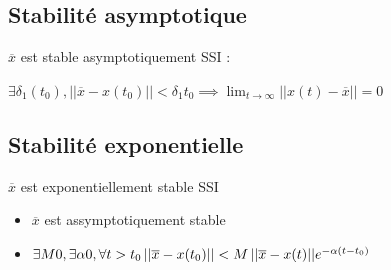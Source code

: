\subsection{Stabilité asymptotique}
$\overline{x}$ est stable asymptotiquement SSI :
\begin{center}
    \Large{$
    \exists \delta_{1}(t_{0}), \left\lvert\lvert \overline{x} - x(t_{0}) \right\rvert\rvert < \delta_{1}t_{0} \implies
    \lim_{t \to \infty}{\left\lvert\lvert x(t) - \overline{x} \right\rvert\rvert} = 0
    $}
\end{center}
\subsection{Stabilité exponentielle}
$\overline{x}$ est exponentiellement stable SSI
\begin{itemize}
    \item $\overline{x}$ est assymptotiquement stable
    \item \Large{$
            \exists M 0 ,\exists \alpha 0, \forall t > t_{0} \newline
            \left\lvert\lvert \overline{x} - x(t_{0}) \right\rvert\rvert < 
            M \left\lvert\lvert \overline{x} - x(t) \right\rvert\rvert e^{-\alpha(t-t_{0})} 
            $}
\end{itemize}
\newpage

